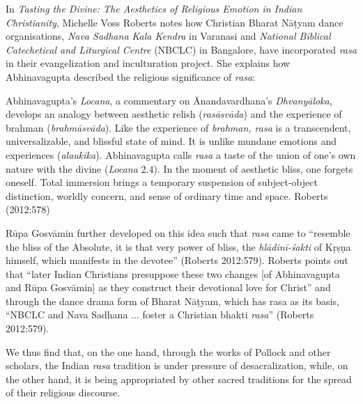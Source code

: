 In \textsl{Tasting the Divine: The Aesthetics of Religious Emotion in Indian Christianity}, Michelle Voss Roberts notes how Christian Bharat Nāṭyam dance organisations, \textsl{Nava Sadhana Kala Kendra} in Varanasi and \textsl{National Biblical Catechetical and Liturgical Centre} (NBCLC) in Bangalore, have incorporated \textsl{rasa} in their evangelization and inculturation project. She explains how Abhinavagupta described the religious significance of \textsl{rasa}:

\begin{myquote}
Abhinavagupta's \textsl{Locana}, a commentary on Ānandavardhana's \textsl{Dhvanyāloka}, develops an analogy between aesthetic relish (\textsl{rasāsvāda}) and the experience of brahman (\textsl{brahmāsvāda}). Like the experience of \textsl{brahman, rasa} is a transcendent, universalizable, and blissful state of mind. It is unlike mundane emotions and experiences (\textsl{alaukika}). Abhinavagupta calls \textsl{rasa} a taste of the union of one's own nature with the divine (\textsl{Locana} 2.4). In the moment of aesthetic bliss, one forgets oneself. Total immersion brings a temporary suspension of subject-object distinction, worldly concern, and sense of ordinary time and space. 
\hfill Roberts (2012:578)
\end{myquote}

Rūpa Gosvāmin further developed on this idea such that \textsl{rasa} came to ``resemble the bliss of the Absolute, it is that very power of bliss, the \textsl{hlādinī-śakti} of Kṛṣṇa himself, which manifests in the devotee'' (Roberts 2012:579). Roberts points out that ``later Indian Christians presuppose these two changes [of Abhinavagupta and Rūpa Gosvāmin] as they construct their devotional love for Christ'' and through the dance drama form of Bharat Nāṭyam, which has rasa as its basis, ``NBCLC and Nava Sadhana ... foster a Christian bhakti \textsl{rasa}'' (Roberts 2012:579). 

We thus find that, on the one hand, through the works of Pollock and other scholars, the Indian \textsl{rasa} tradition is under pressure of desacralization, while, on the other hand, it is being appropriated by other sacred traditions for the spread of their religious discourse.


